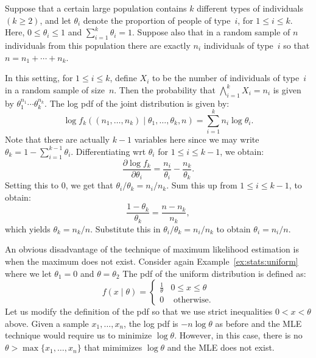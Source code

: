 \begin{example}
Suppose that a certain large population contains $k$ different types of 
individuals $(k \geq 2)$, and let $\theta_i$ denote the proportion of people 
of type~$i$, for $1 \leq i \leq k$. Here, $0 \leq \theta_i \leq 1$ and 
$\sum_{i = 1}^k \theta_i = 1$. Suppose also that in a random sample of $n$ 
individuals from this population there are exactly $n_i$ individuals of type~$i$
so that $n = n_1 + \cdots + n_k$.

In this setting, for $1 \leq i \leq k$, define $X_i$ to be the number of 
individuals of type~$i$ in a random sample of size~$n$. Then the probability 
that $\bigwedge_{i = 1}^k X_i = n_i$ is given by $\theta_1^{n_1} \cdots \theta_k^{n_k}$.  
The log pdf of the joint distribution is given by:
\[
    \log f_k((n_1, \ldots, n_k) \mid \theta_1, \ldots, \theta_k, n) 
        = \sum_{i = 1}^k n_i \log \theta_i. 
\] 
Note that there are actually $k - 1$ variables here since we may write 
$\theta_k = 1 - \sum_{i = 1}^{k - 1} \theta_i$. Differentiating wrt $\theta_i$
for $1 \leq i \leq k - 1$, we obtain:
\[
    \frac{\partial \log f_k}{\partial \theta_i} 
        = \frac{n_i}{\theta_i} - \frac{n_k}{\theta_k}. 
\]
Setting this to $0$, we get that $\theta_i / \theta_k = n_i / n_k$. Sum this up
from $1 \leq i \leq k - 1$, to obtain:
\[
    \frac{1 - \theta_k}{\theta_k} = \frac{n - n_k}{n_k},
\] 
which yields $\theta_k = n_k / n$. Substitute this in $\theta_i / \theta_k = n_i / n_k$
to obtain $\theta_i = n_i / n$.
\eop
\end{example} 

\begin{example}
An obvious disadvantage of the technique of maximum likelihood estimation 
is when the maximum does not exist. Consider again Example~\ref{ex:stats:uniform}
where we let $\theta_1 = 0$ and $\theta = \theta_2$
The pdf of the uniform distribution is defined as:
\[
    f(x \mid \theta) 
        = \left \{ 
            \begin{array}{ll}
                \frac{1}{\theta} & 0 \leq x \leq \theta \\
                0  & \text{ otherwise}. 
            \end{array}
          \right . 
\]
Let us modify the definition of the pdf so that we use strict inequalities 
$0 < x < \theta$ above. Given a sample $x_1, \ldots, x_n$, the log pdf is 
$- n \log \theta$ as before and the MLE technique would require us to 
minimize $\log \theta$. However, in this case, there is no  
$\theta > \max \{x_1, \ldots, x_n\}$ that mimimizes $\log \theta$ and the 
MLE does not exist.    
\eop 
\end{example}


